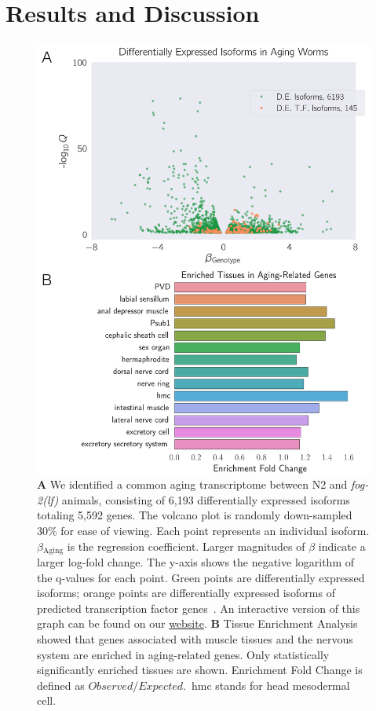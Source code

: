 \documentclass[9pt,twocolumn,twoside]{gsajnl}
\newcommand{\fog}{\emph{\mbox{fog-2(lf)}}}
\newcommand{\agen}{5,592}
\newcommand{\webref}{
\href{https://wormlabcaltech.github.io/Angeles_Leighton_2016/}{website}}
\begin{document}
\section{Results and Discussion}
\begin{figure}[htbp]
\renewcommand{\familydefault}{\sfdefault}\normalfont{}
\centering
\includegraphics[width=\linewidth]{../../output/figs/final_figs/aging_transcriptomics.pdf}
\caption{
\textbf{A} We identified a common aging transcriptome between N2 and
\fog{} animals, consisting of 6,193 differentially expressed isoforms totaling
\agen{} genes. The volcano plot is randomly down-sampled 30\% for ease of
viewing. Each point represents an individual isoform. $\beta{}_\mathrm{Aging}$
is the regression coefficient. Larger magnitudes of $\beta$ indicate a larger
log-fold change. The y-axis shows the negative logarithm of the q-values for
each point. Green points are differentially expressed isoforms; orange points
are differentially expressed isoforms of  predicted transcription factor
genes~\citep{Reece-Hoyes2005}. An interactive version of this graph can be found
on our \webref{}.
\textbf{B} Tissue Enrichment Analysis~\citep{Angeles-Albores2016} showed that
genes associated with muscle tissues and the nervous system are enriched in
aging-related genes. Only statistically significantly enriched tissues are shown.
Enrichment Fold Change is defined as $Observed/Expected$.\ hmc stands for head
mesodermal cell.
}
\label{fig:agingtranscriptome}
\end{figure}
\end{document}
